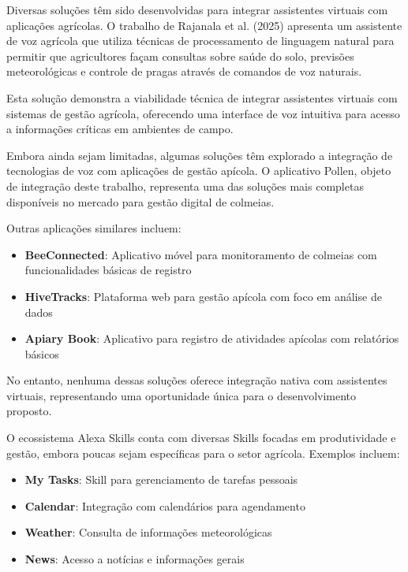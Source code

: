 
Diversas soluções têm sido desenvolvidas para integrar assistentes virtuais com aplicações agrícolas. O trabalho de Rajanala et al. (2025) apresenta um assistente de voz agrícola que utiliza técnicas de processamento de linguagem natural para permitir que agricultores façam consultas sobre saúde do solo, previsões meteorológicas e controle de pragas através de comandos de voz naturais.

Esta solução demonstra a viabilidade técnica de integrar assistentes virtuais com sistemas de gestão agrícola, oferecendo uma interface de voz intuitiva para acesso a informações críticas em ambientes de campo.


Embora ainda sejam limitadas, algumas soluções têm explorado a integração de tecnologias de voz com aplicações de gestão apícola. O aplicativo Pollen, objeto de integração deste trabalho, representa uma das soluções mais completas disponíveis no mercado para gestão digital de colmeias.

Outras aplicações similares incluem:
\begin{itemize}
    \item \textbf{BeeConnected}: Aplicativo móvel para monitoramento de colmeias com funcionalidades básicas de registro
    \item \textbf{HiveTracks}: Plataforma web para gestão apícola com foco em análise de dados
    \item \textbf{Apiary Book}: Aplicativo para registro de atividades apícolas com relatórios básicos
\end{itemize}

No entanto, nenhuma dessas soluções oferece integração nativa com assistentes virtuais, representando uma oportunidade única para o desenvolvimento proposto.


O ecossistema Alexa Skills conta com diversas Skills focadas em produtividade e gestão, embora poucas sejam específicas para o setor agrícola. Exemplos incluem:

\begin{itemize}
    \item \textbf{My Tasks}: Skill para gerenciamento de tarefas pessoais
    \item \textbf{Calendar}: Integração com calendários para agendamento
    \item \textbf{Weather}: Consulta de informações meteorológicas
    \item \textbf{News}: Acesso a notícias e informações gerais
\end{itemize}

